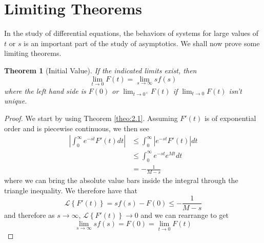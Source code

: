 \documentclass{report}
\newtheorem{theorem}{Theorem}[chapter]
\theoremstyle{definition}
\theoremstyle{remark}
\newcommand{\lapt}[1]{\mathscr{L}\left\{ #1\right\}}
\begin{document}
\section{Limiting Theorems}
In the study of differential equations, the behaviors of systems for large values of $t$ or $s$ is an important part of the study of asymptotics. We shall now prove some limiting theorems.
\begin{theorem} [Initial Value]
    If the indicated limits exist, then 
    \begin{equation*}
        \lim_{t\rightarrow 0} F(t) = \lim_{s\rightarrow \infty} sf(s)\label{theo:ivt}
    \end{equation*}
    where the left hand side is $F(0)$ or $\lim_{t\rightarrow 0^+}F(t)$ if $\lim_{t\rightarrow 0}F(t)$ isn't unique.
\end{theorem}
\begin{proof}
    We start by using Theorem \ref{theo:2.1}. Assuming $F'(t)$ is of exponential order and is piecewise continuous, we then see 
    \begin{equation*}
    \begin{split}
        \left| \int^\infty_0e^{-st}F'(t)dt \right| &\leq \int^\infty_0 |e^{-st}F'(t)|dt \\
        & \leq \int^\infty_0e^{-st}e^{Mt} dt \\
        &=-\frac{1}{M-s}
    \end{split}
    \end{equation*}
    where we can bring the absolute value bars inside the integral through the triangle inequality. We therefore have that 
    \begin{equation*}
        \lapt{F'(t)} = sf(s) -F(0)\leq -\frac{1}{M-s}
    \end{equation*}
    and therefore as $s\rightarrow \infty$, $\lapt{F'(t)} \rightarrow 0$ and we can rearrange to get 
    \begin{equation*}
        \lim_{s\rightarrow \infty }sf(s) = F(0) =\lim_{t\rightarrow 0}F(t)
    \end{equation*}
\end{proof}
\end{document}
